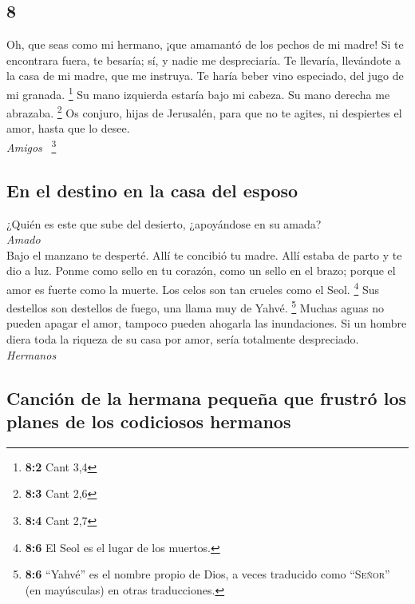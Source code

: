\begin{paracol}{2}
\hypertarget{section-14}{%
\section{8}\label{section-14}}

 Oh, que seas como mi hermano, ¡que amamantó de los pechos
de mi madre! Si te encontrara fuera, te besaría; sí, y nadie me
despreciaría.  Te llevaría, llevándote a la casa de mi
madre, que me instruya. Te haría beber vino especiado, del jugo de mi
granada. \footnote{\textbf{8:2} Cant 3,4}  Su mano
izquierda estaría bajo mi cabeza. Su mano derecha me abrazaba.
\footnote{\textbf{8:3} Cant 2,6}  Os conjuro, hijas de
Jerusalén, para que no te agites, ni despiertes el amor, hasta que lo
desee.\\
\emph{Amigos} ~\footnote{\textbf{8:4} Cant 2,7}

\hypertarget{en-el-destino-en-la-casa-del-esposo}{%
\subsection{En el destino en la casa del
esposo}\label{en-el-destino-en-la-casa-del-esposo}}

 ¿Quién es este que sube del desierto, ¿apoyándose en su
amada?\\
\emph{Amado}\\
Bajo el manzano te desperté. Allí te concibió tu madre. Allí estaba de
parto y te dio a luz.  Ponme como sello en tu corazón,
como un sello en el brazo; porque el amor es fuerte como la muerte. Los
celos son tan crueles como el Seol. \footnote{\textbf{8:6} El Seol es el
  lugar de los muertos.} Sus destellos son destellos de fuego, una llama
muy de Yahvé. \footnote{\textbf{8:6} ``Yahvé'' es el nombre propio de
  Dios, a veces traducido como ``\textsc{Señor}'' (en mayúsculas) en
  otras traducciones.}  Muchas aguas no pueden apagar el
amor, tampoco pueden ahogarla las inundaciones. Si un hombre diera toda
la riqueza de su casa por amor, sería totalmente despreciado.\\
\emph{Hermanos}\\

\hypertarget{canciuxf3n-de-la-hermana-pequeuxf1a-que-frustruxf3-los-planes-de-los-codiciosos-hermanos}{%
\subsection{Canción de la hermana pequeña que frustró los planes de los
codiciosos
hermanos}\label{canciuxf3n-de-la-hermana-pequeuxf1a-que-frustruxf3-los-planes-de-los-codiciosos-hermanos}}


\end{paracol}
